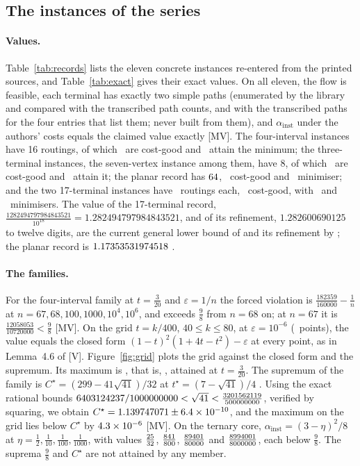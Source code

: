 \documentclass[11pt]{article}
\theoremstyle{remark}
\begin{document}
\subsection{The instances of the series}
\label{sec:records}

\paragraph{Values.} Table~\ref{tab:records} lists the eleven concrete instances re-entered from the printed sources, and Table~\ref{tab:exact} gives their exact values. On all eleven, the flow is feasible, each terminal has exactly two simple paths (enumerated by the library and compared with the transcribed path counts, and with the transcribed paths for the four entries that list them; never built from them), and $\alpha_{\mathrm{inst}}$ under the authors' costs equals the claimed value exactly [MV]. The four-interval instances have 16 routings, of which \nfourgood\ are cost-good and \nfourmin\ attain the minimum; the three-terminal instances, the seven-vertex instance among them, have 8, of which \nsmallgood\ are cost-good and \nsmallmin\ attain it; the planar record has $64$, \nksixgood\ cost-good and \nksixmin\ minimiser; and the two 17-terminal instances have \nkroutings\ routings each, \nkcostgood\ cost-good, with \nkrecmin\ and \nkrefmin\ minimisers. The value of the 17-terminal record, $\tfrac{1282494797984843521}{10^{18}}=1.282494797984843521$, and of its refinement, $1.282600690125$ to twelve digits, are the current general lower bound of \cite{Nik2} and its refinement by \cite{DLF26}; the planar record is $1.17353531974518$ \cite{Nik3}.




\paragraph{The families.} For the four-interval family at $t=\tfrac3{20}$ and $\varepsilon=1/n$ the forced violation is $\tfrac{182359}{160000}-\tfrac1n$ at $n=67,68,100,1000,10^4,10^6$, and exceeds $\tfrac98$ from $n=68$ on; at $n=67$ it is $\tfrac{12058053}{10720000}<\tfrac98$ [MV]. On the grid $t=k/400$, $40\le k\le80$, at $\varepsilon=10^{-6}$ (\ngridpts\ points), the value equals the closed form $(1-t)^2(1+4t-t^2)-\varepsilon$ at every point, as in Lemma~4.6 of \cite{Nik1} [V]. Figure~\ref{fig:grid} plots the grid against the closed form and the supremum. Its maximum is \ngridmaxalpha, that is, \ngridmaxdec, attained at $t=\tfrac3{20}$. The supremum of the family is
$C^\star=(299-41\sqrt{41})/32$ at $t^\star=(7-\sqrt{41})/4$ \cite{Pro26,Nik1}. Using the exact rational bounds $6403124237/1000000000<\sqrt{41}<\tfrac{3201562119}{500000000}$, verified by squaring, we obtain $C^\star=1.139747071\pm6.4\times10^{-10}$, and the maximum on the grid lies below $C^\star$ by $4.3\times10^{-6}$ [MV]. On the ternary core, $\alpha_{\mathrm{inst}}=(3-\eta)^2/8$ at $\eta=\tfrac12,\tfrac1{10},\tfrac1{100},\tfrac1{1000}$, with values $\tfrac{25}{32}$, $\tfrac{841}{800}$, $\tfrac{89401}{80000}$ and $\tfrac{8994001}{8000000}$, each below $\tfrac98$. The suprema $\tfrac98$ and $C^\star$ are not attained by any member.
\end{document}
